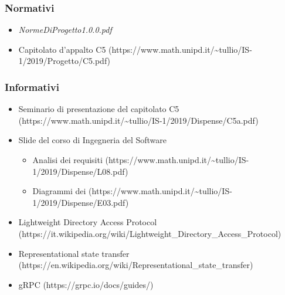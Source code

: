 \documentclass[../analisi-dei-requisiti]{subfiles}
\begin{document}
\subsubsection{Normativi}%
\label{par:normativi}
\begin{itemize}
  \item \textit{NormeDiProgetto1.0.0.pdf}
  \item Capitolato d'appalto C5 (https://www.math.unipd.it/\textasciitilde tullio/IS-1/2019/Progetto/C5.pdf)
\end{itemize}
\subsubsection{Informativi}%
\label{par:informativi}
\begin{itemize}
  \item Seminario di presentazione del capitolato C5 (https://www.math.unipd.it/\textasciitilde tullio/IS-1/2019/Dispense/C5a.pdf)
  \item Slide del corso di Ingegneria del Software
        \begin{itemize}
          \item Analisi dei requisiti (https://www.math.unipd.it/\textasciitilde tullio/IS-1/2019/Dispense/L08.pdf)
          \item Diagrammi dei  (https://www.math.unipd.it/\textasciitilde tullio/IS-1/2019/Dispense/E03.pdf)
        \end{itemize}
  \item Lightweight Directory Access Protocol (https://it.wikipedia.org/wiki/Lightweight\_Directory\_Access\_Protocol)
  \item Representational state transfer (https://en.wikipedia.org/wiki/Representational\_state\_transfer)
  \item gRPC (https://grpc.io/docs/guides/)
\end{itemize}
\end{document}
